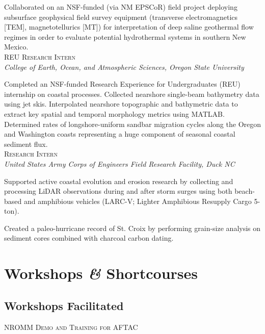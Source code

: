 \documentclass[11pt, letterpaper]{article}
\newcommand{\amper}{{\fontspec[Scale=.95]{Adobe Caslon Pro}\selectfont\itshape\&}}
\newcommand{\years}[1]{\marginnote{\scriptsize #1}}
\begin{document}
	Collaborated on an NSF-funded (via NM EPSCoR) field project deploying
	subsurface geophysical field survey equipment (transverse electromagnetics [TEM],
	magnetotellurics [MT]) for interpretation of deep saline geothermal flow
	regimes in order to evaluate potential hydrothermal systems in southern New
	Mexico.\\

\noindent
\years{2013}\textsc{REU Research Intern}\\
\textit{College of Earth, Ocean, and Atmospheric Sciences, Oregon State University}

    \vspace{3pt} \noindent  
    Completed an NSF-funded Research Experience for Undergraduates (REU)
    internship on coastal processes. Collected nearshore single-beam bathymetry
    data using jet skis. Interpolated nearshore topographic and bathymetric
    data to extract key spatial and temporal morphology metrics using MATLAB.
    Determined rates of longshore-uniform sandbar migration cycles along the
    Oregon and Washington coasts representing a huge component of seasonal
    coastal sediment flux.\\

\noindent
\years{2013}\textsc{Research Intern}\\
\textit{United States Army Corps of Engineers Field Research Facility, Duck NC}

    \vspace{3pt} \noindent  
    Supported active coastal evolution and erosion research by collecting and
    processing LiDAR observations during and after storm surges using both
    beach-based and amphibious vehicles (LARC-V; Lighter Amphibious Resupply
    Cargo 5-ton).

	Created a paleo-hurricane record of St. Croix by performing grain-size
	analysis on sediment cores combined with charcoal carbon dating.

\setlength{\parindent}{0pt}  %

\section*{Workshops \amper{} Shortcourses}

\subsection*{Workshops Facilitated}
\label{sec:workshopsFacilitated}
\noindent
\years{2021}\textsc{NROMM Demo and Training for AFTAC}%
\end{document}
